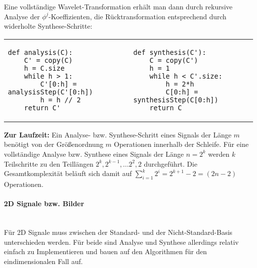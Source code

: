 \noindent Eine vollständige Wavelet-Transformation erhält man dann durch rekursive Analyse der $\phi^{j}$-Koeffizienten, die Rücktransformation entsprechend durch widerholte Synthese-Schritte:

\begin{adjustbox}{max width=\textwidth ,center}
\begin{tabular}{p{}|p{}}
\begin{verbatim}
def analysis(C):
    C' = copy(C)
    h = C.size
    while h > 1:
        C'[0:h] = analysisStep(C'[0:h])
        h = h // 2
    return C'
\end{verbatim}
&
\begin{verbatim}
def synthesis(C'):
    C = copy(C')
    h = 1
    while h < C'.size:
        h = 2*h
        C[0:h] = synthesisStep(C[0:h])
    return C
\end{verbatim}
\\
\end{tabular}
\end{adjustbox}

\noindent \textbf{Zur Laufzeit:} Ein Analyse- bzw. Synthese-Schritt eines Signals der Länge $m$ benötigt von der Größenordnung $m$ Operationen innerhalb der Schleife. Für eine vollständige Analyse bzw. Synthese eines Signals der Länge $n=2^k$ werden $k$ Teilschritte zu den Teillängen $2^k, 2^{k-1}, ... 2^2, 2$ durchgeführt. Die Gesamtkomplexität beläuft sich damit auf $\sum_{i=1}^k 2^i = 2^{k+1}-2 = (2n-2)$ Operationen.
%
\paragraph{2D Signale bzw. Bilder}~\\
Für 2D Signale muss zwischen der Standard- und der Nicht-Standard-Basis unterschieden werden. Für beide sind Analyse und Synthese allerdings relativ einfach zu Implementieren und bauen auf den Algorithmen für den eindimensionalen Fall auf.

